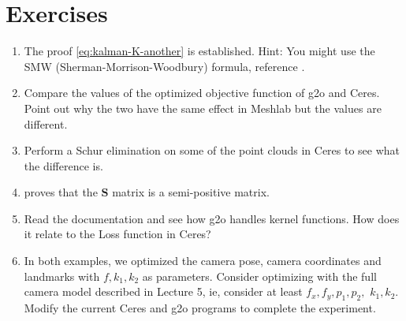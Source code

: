 \section*{ Exercises}
\begin{enumerate}
    \item The  proof \eqref{eq:kalman-K-another} is established. Hint: You might use the SMW (Sherman-Morrison-Woodbury) formula, reference \cite{Sherman1950, Barfoot2016}.
    \item Compare the values ​​of the optimized objective function of g2o and Ceres. Point out why the two have the same effect in Meshlab but the values ​​are different.
    \item Perform a Schur elimination on some of the point clouds in Ceres to see what the difference is.
    \item proves that the $\bm{S}$ matrix is ​​a semi-positive matrix.
    \item Read the documentation \cite{Kummerle2011} and see how g2o handles kernel functions. How does it relate to the Loss function in Ceres?
    \item[\optional] In both examples, we optimized the camera pose, camera coordinates and landmarks with $f, k_1, k_2$ as parameters. Consider optimizing with the full camera model described in Lecture 5, ie, consider at least $f_x, f_y, p_1, p_2, $ $k_1, k_2$. Modify the current Ceres and g2o programs to complete the experiment.
\end{enumerate}
